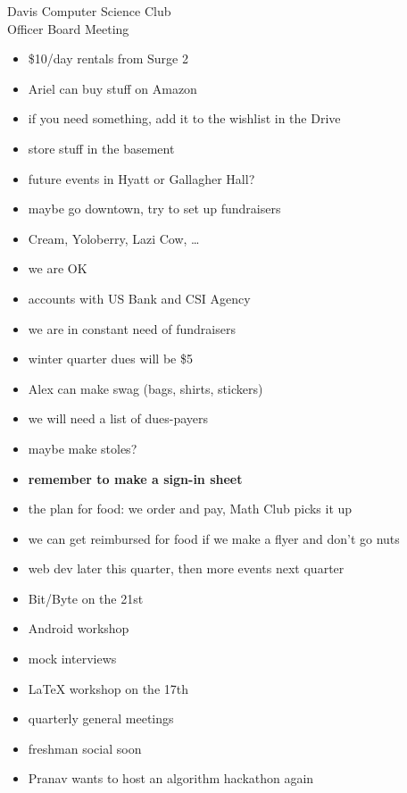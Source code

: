 \documentclass{article}
\begin{document}
\begin{Minutes}{Davis Computer Science Club\\Officer Board Meeting}
\begin{itemize}
\item \$10/day rentals from Surge 2
\item Ariel can buy stuff on Amazon
\item if you need something, add it to the wishlist in the Drive
\item store stuff in the basement
\end{itemize}

\begin{itemize}
\item future events in Hyatt or Gallagher Hall?
\item maybe go downtown, try to set up fundraisers
\item Cream, Yoloberry, Lazi Cow, \dots
\end{itemize}

\begin{itemize}
\item we are OK
\item accounts with US Bank and CSI Agency
\item we are in constant need of fundraisers
\item winter quarter dues will be \$5
\item Alex can make swag (bags, shirts, stickers)
\item we will need a list of dues-payers
\item maybe make stoles?
\end{itemize}

\begin{itemize}
\item \textbf{remember to make a sign-in sheet}
\item the plan for food: we order and pay, Math Club picks it up
\item we can get reimbursed for food if we make a flyer and don't go nuts
\end{itemize}

\begin{itemize}
\item web dev later this quarter, then more events next quarter
\item Bit/Byte on the 21st
\item Android workshop
\item mock interviews
\item LaTeX workshop on the 17th
\item quarterly general meetings
\item freshman social soon
\item Pranav wants to host an algorithm hackathon again
\end{itemize}

\thispagestyle{creditfooter}
\end{Minutes}
\end{document}
